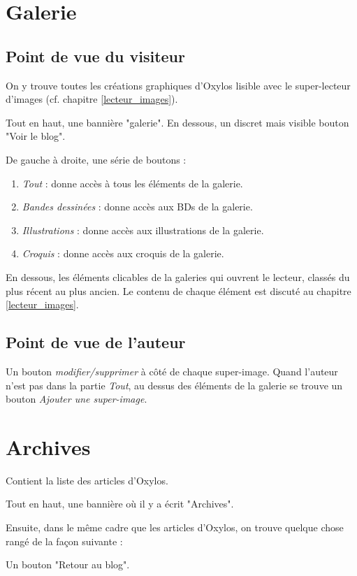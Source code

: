 \documentclass[french]{report}
\theoremstyle{plain}
\begin{document}
	\section{Galerie} \label{galerie}
		\subsection{Point de vue du visiteur}
			On y trouve toutes les créations graphiques d'Oxylos lisible avec le super-lecteur d'images (cf. chapitre \ref{lecteur_images}). 

			Tout en haut, une bannière "galerie". En dessous, un discret mais visible bouton "Voir le blog".

			De gauche à droite, une série de boutons :
			\begin{enumerate}
				\item \emph{Tout} : donne accès à tous les éléments de la galerie.
				\item \emph{Bandes dessinées} : donne accès aux BDs de la galerie.
				\item \emph{Illustrations} : donne accès aux illustrations de la galerie.
				\item \emph{Croquis} : donne accès aux croquis de la galerie. 
			\end{enumerate}

			En dessous, les éléments clicables de la galeries qui ouvrent le lecteur, classés du plus récent au plus ancien.
			Le contenu de chaque élément est discuté au chapitre \ref{lecteur_images}.

		\subsection{Point de vue de l'auteur}
			Un bouton \emph{modifier/supprimer} à côté de chaque super-image. Quand l'auteur n'est pas dans la partie \emph{Tout}, au dessus des éléments de la galerie se trouve un bouton \emph{Ajouter une super-image}.


	\section{Archives}\label{archives}
		Contient la liste des articles d'Oxylos.

		Tout en haut, une bannière où il y a écrit "Archives".

		Ensuite, dans le même cadre que les articles d'Oxylos, on trouve quelque chose rangé de la façon suivante :

		Un bouton "Retour au blog".
\end{document}
